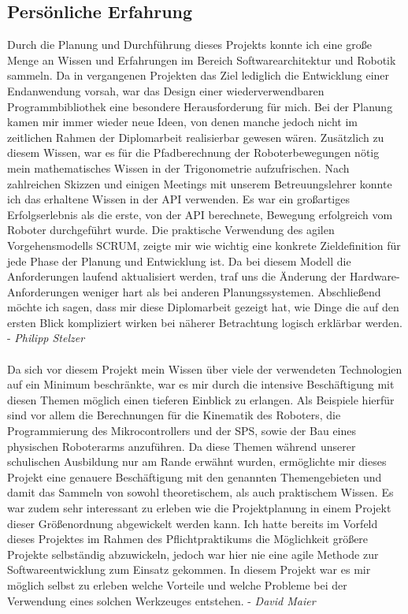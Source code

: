 \subsection{Persönliche Erfahrung}
\par
\begingroup
\leftskip=1cm 
\rightskip=1cm 
\noindent
Durch die Planung und Durchführung dieses Projekts konnte ich eine große Menge an Wissen und Erfahrungen im Bereich Softwarearchitektur und Robotik sammeln. Da in vergangenen Projekten das Ziel lediglich die Entwicklung einer Endanwendung vorsah, war das Design einer wiederverwendbaren Programmbibliothek eine besondere Herausforderung für mich. Bei der Planung kamen mir immer wieder neue Ideen, von denen manche jedoch nicht im zeitlichen Rahmen der Diplomarbeit realisierbar gewesen wären. Zusätzlich zu diesem Wissen, war es für die Pfadberechnung der Roboterbewegungen nötig mein mathematisches Wissen in der Trigonometrie aufzufrischen. Nach zahlreichen Skizzen und einigen Meetings mit unserem Betreuungslehrer konnte ich das erhaltene Wissen in der API verwenden. Es war ein großartiges Erfolgserlebnis als die erste, von der API berechnete, Bewegung erfolgreich vom Roboter durchgeführt wurde. Die praktische Verwendung des agilen Vorgehensmodells SCRUM, zeigte mir wie wichtig eine konkrete Zieldefinition für jede Phase der Planung und Entwicklung ist. Da bei diesem Modell die Anforderungen laufend aktualisiert werden, traf uns die Änderung der Hardware-Anforderungen weniger hart als bei anderen Planungssystemen. Abschließend möchte ich sagen, dass mir diese Diplomarbeit gezeigt hat, wie Dinge die auf den ersten Blick kompliziert wirken bei näherer Betrachtung logisch erklärbar werden. - \textit{Philipp Stelzer}
\\\\
Da sich vor diesem Projekt mein Wissen über viele der verwendeten Technologien auf ein Minimum beschränkte, war es mir durch die intensive Beschäftigung mit diesen Themen möglich einen tieferen Einblick zu erlangen. Als Beispiele hierfür sind vor allem die Berechnungen für die Kinematik des Roboters, die Programmierung des Mikrocontrollers und der SPS, sowie der Bau eines physischen Roboterarms anzuführen. Da diese Themen während unserer schulischen Ausbildung nur am Rande erwähnt wurden, ermöglichte mir dieses Projekt eine genauere Beschäftigung mit den genannten Themengebieten und damit das Sammeln von sowohl theoretischem, als auch praktischem Wissen.
Es war zudem sehr interessant zu erleben wie die Projektplanung in einem Projekt dieser Größenordnung abgewickelt werden kann. Ich hatte bereits im Vorfeld dieses Projektes im Rahmen des Pflichtpraktikums die Möglichkeit größere Projekte selbständig abzuwickeln, jedoch war hier nie eine agile Methode zur Softwareentwicklung zum Einsatz gekommen. In diesem Projekt war es mir möglich selbst zu erleben welche Vorteile und welche Probleme bei der Verwendung eines solchen Werkzeuges entstehen.  - \textit{David Maier}
\par
\endgroup
